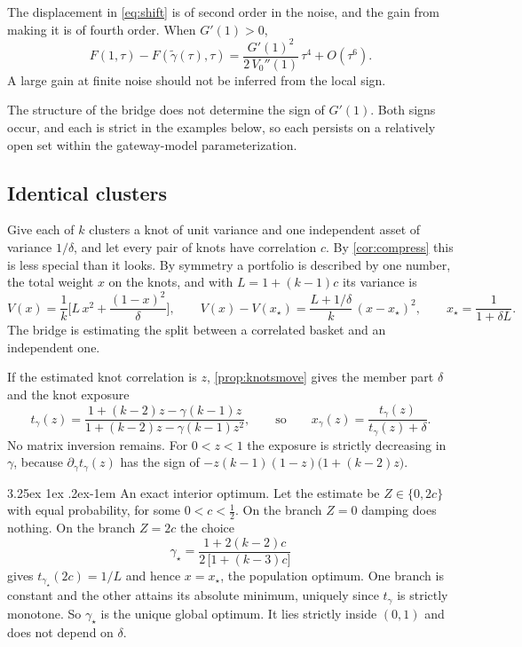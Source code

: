 \documentclass[11pt]{article}
\makeatletter
\renewcommand\paragraph{\@startsection{paragraph}{4}{\z@}%
  {3.25ex \@plus1ex \@minus.2ex}{-1em}%
  {\normalfont\normalsize\itshape}}
\makeatother
\begin{document}
The displacement in \eqref{eq:shift} is of second order in the noise, and
the gain from making it is of fourth order. When $G'(1)>0$,
\begin{equation}
  F(1,\tau)-F(\tilde\gamma(\tau),\tau)
  =\frac{G'(1)^2}{2\,V_0''(1)}\,\tau^4+O(\tau^6).
  \label{eq:gain}
\end{equation}
A large gain at finite noise should not be inferred from the local sign.

The structure of the bridge does not determine the sign of $G'(1)$. Both
signs occur, and each is strict in the examples below, so each persists on
a relatively open set within the gateway-model parameterization.

\subsection{Identical clusters}

Give each of $k$ clusters a knot of unit variance and one independent asset
of variance $1/\delta$, and let every pair of knots have correlation $c$.
By \cref{cor:compress} this is less special than it looks. By symmetry a
portfolio is described by one number, the total weight $x$ on the knots,
and with $L=1+(k-1)c$ its variance is
\begin{equation}
  V(x)=\frac1k\Big[L\,x^2+\frac{(1-x)^2}{\delta}\Big],
  \qquad
  V(x)-V(x_\star)=\frac{L+1/\delta}{k}\,(x-x_\star)^2,
  \qquad x_\star=\frac{1}{1+\delta L}.
  \label{eq:scalar}
\end{equation}
The bridge is estimating the split between a correlated basket and an
independent one.

If the estimated knot correlation is $z$, \cref{prop:knotsmove} gives the
member part $\delta$ and the knot exposure
\begin{equation}
  t_\gamma(z)=\frac{1+(k-2)z-\gamma(k-1)z}{1+(k-2)z-\gamma(k-1)z^2},
  \qquad\text{so}\qquad
  x_\gamma(z)=\frac{t_\gamma(z)}{t_\gamma(z)+\delta}.
  \label{eq:tgamma}
\end{equation}
No matrix inversion remains. For $0<z<1$ the exposure is strictly
decreasing in $\gamma$, because $\partial_\gamma t_\gamma(z)$ has the sign
of $-z(k-1)(1-z)\big(1+(k-2)z\big)$.

\paragraph{An exact interior optimum.} Let the estimate be $Z\in\{0,2c\}$
with equal probability, for some $0<c<\tfrac12$. On the branch $Z=0$
damping does nothing. On the branch $Z=2c$ the choice
\begin{equation}
  \gamma_\star=\frac{1+2(k-2)c}{2\,\big[1+(k-3)c\big]}
  \label{eq:gammastar}
\end{equation}
gives $t_{\gamma_\star}(2c)=1/L$ and hence $x=x_\star$, the population optimum.
One branch is constant and the other attains its absolute minimum, uniquely
since $t_\gamma$ is strictly monotone. So $\gamma_\star$ is the unique
global optimum. It lies strictly inside $(0,1)$ and does not depend on
$\delta$.
\end{document}
